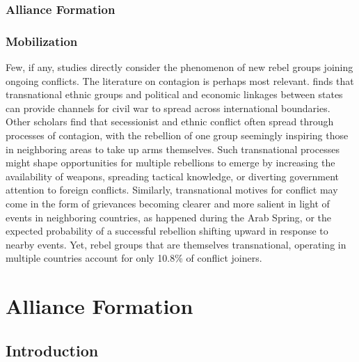\documentclass[12pt,]{article}
\begin{document}
\subsubsection{Alliance Formation}\label{alliance-formation}

\subsubsection{Mobilization}\label{mobilization}

Few, if any, studies directly consider the phenomenon of new rebel
groups joining ongoing conflicts. The literature on contagion is perhaps
most relevant. \citet{Gleditsch2007} finds that transnational ethnic
groups and political and economic linkages between states can provide
channels for civil war to spread across international boundaries. Other
scholars find that secessionist \citep{Ayres2000} and ethnic
\citep{Lane2016} conflict often spread through processes of contagion,
with the rebellion of one group seemingly inspiring those in neighboring
areas to take up arms themselves. Such transnational processes might
shape opportunities for multiple rebellions to emerge by increasing the
availability of weapons, spreading tactical knowledge, or diverting
government attention to foreign conflicts. Similarly, transnational
motives for conflict may come in the form of grievances becoming clearer
and more salient in light of events in neighboring countries, as
happened during the Arab Spring, or the expected probability of a
successful rebellion shifting upward in response to nearby events. Yet,
rebel groups that are themselves transnational, operating in multiple
countries \citep[see][]{salehyan07} account for only 10.8\% of conflict
joiners.

\section{Alliance Formation}\label{alliance-formation-1}

\subsection{Introduction}\label{introduction-1}
\end{document}
